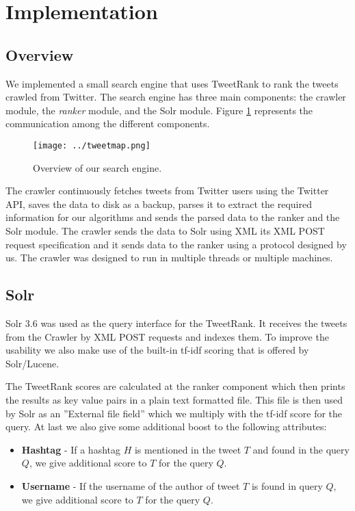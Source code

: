 \section {Implementation}

\subsection{Overview}
We implemented a small search engine that uses TweetRank to rank the tweets crawled from Twitter. The search engine has three main components: the crawler module, the \emph{ranker} module, and the Solr module. Figure \ref{fig:overview} represents the communication among the different components.

\begin{figure}
\centering
\texttt{[image: ../tweetmap.png]} 
\caption{Overview of our search engine.}
\label{fig:overview}
\end{figure}

The crawler continuously fetches tweets from Twitter users using the Twitter API, saves the data to disk as a backup, parses it to extract the required information for our algorithms and sends the parsed data to the ranker and the Solr module. The crawler sends the data to Solr using XML its XML POST request specification and it sends data to the ranker using a protocol designed by us. The crawler was designed to run in multiple threads or multiple machines.





\subsection{Solr}
Solr 3.6 was used as the query interface for the TweetRank. It receives the tweets from the Crawler by XML POST requests and indexes them. To improve the usability we also make use of the built-in tf-idf scoring that is offered by Solr/Lucene.

The TweetRank scores are calculated at the ranker component which then prints the results as key value pairs in a plain text formatted file. This file is then used by Solr as an ''External file field'' which we multiply with the tf-idf score for the query. At last we also give some additional boost to the following attributes:

\begin{itemize}
	\item \textbf{Hashtag} - If a hashtag $H$ is mentioned in the tweet $T$ and found in the query $Q$, we give additional score to $T$ for the query $Q$.
	\item \textbf{Username} - If the username of the author of tweet $T$ is found in query $Q$, we give additional score to $T$ for the query $Q$.
\end{itemize}
